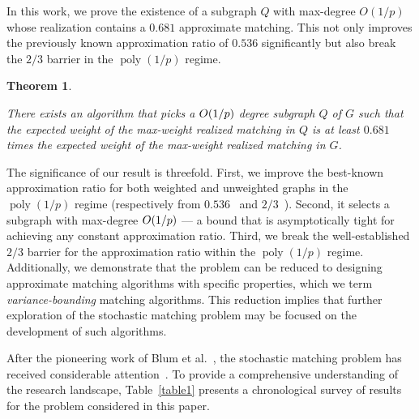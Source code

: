 \documentclass[letterpaper,11pt]{article}
\makeatletter
\DeclareMathOperator{\poly}{poly}
\renewcommand{\O}[1]{\ensuremath{O\left(#1\right)}}
\let\originalleft\left
\let\originalright\right
\renewcommand{\left}{\mathopen{}\mathclose\bgroup\originalleft}
\renewcommand{\right}{\aftergroup\egroup\originalright}
\newtheorem{theorem}{Theorem}[section]
\renewcommand{\paragraph}{\@startsection{paragraph}{4}{\z@}{10pt}{-1em}{\normalfont\normalsize\bfseries}}
\makeatother
\begin{document}
In this work, we prove the existence of a subgraph $Q$ with max-degree $O(1/p)$ whose realization contains a $0.681$ approximate matching. This not only improves the previously known approximation ratio of $0.536$ significantly but also break the $2/3$ barrier in the $\poly(1/p)$ regime.


\newcommand{\thmmain}[0]{
There exists an algorithm that picks a $\O{1/p}$ degree subgraph $Q$ of $G$ such that the expected weight of the max-weight realized matching in $Q$ is at least $0.681$ times the expected weight of the max-weight realized matching in $G$.
}
\begin{mdframed} [backgroundcolor=gray!20]
\begin{theorem}
\label{thm:Themain}
\thmmain
\end{theorem}
\end{mdframed}



The significance of our result is threefold. First, we  improve the best-known approximation ratio for both weighted and unweighted graphs  in the $\poly(1/p)$ regime (respectively from $0.536$~\cite{DughmiKP23} and $2/3$~\cite{sosa19}). Second, it selects a subgraph with max-degree $\O{1/p}$  --- a bound that is asymptotically tight for achieving any constant approximation ratio. Third, we break the well-established $2/3$ barrier for the approximation ratio within the $\poly(1/p)$ regime. Additionally, we demonstrate that the problem can be reduced to designing approximate matching algorithms with specific properties, which we term {\em variance-bounding} matching algorithms. This reduction implies that further exploration of the stochastic matching problem may be focused on the development of such algorithms.




\paragraph{Further Related Work.} After the pioneering work of Blum et al.~\cite{blumetal}, the stochastic matching problem has received considerable attention~\cite{blumetal,AKL16,AKL17,YM18,BR18,soda19,sosa19, d2019stochastic, stoc20, behnezhad2020stochastic}. To provide a comprehensive understanding of the research landscape, Table~\ref{table1} presents a chronological survey of results for the problem considered in this paper. 
\end{document}
